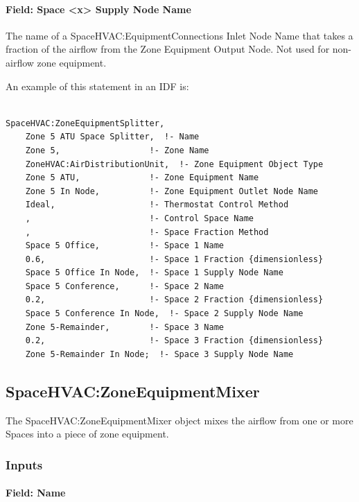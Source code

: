 \paragraph{Field: Space \textless{}x\textgreater{} Supply Node Name}\label{field-seqsplitter-space-supply-node-name}

The name of a SpaceHVAC:EquipmentConnections Inlet Node Name that takes a fraction of the airflow from the Zone Equipment Output Node.
Not used for non-airflow zone equipment.

An example of this statement in an IDF is:

\begin{lstlisting}

SpaceHVAC:ZoneEquipmentSplitter,
    Zone 5 ATU Space Splitter,  !- Name
    Zone 5,                  !- Zone Name
    ZoneHVAC:AirDistributionUnit,  !- Zone Equipment Object Type
    Zone 5 ATU,              !- Zone Equipment Name
    Zone 5 In Node,          !- Zone Equipment Outlet Node Name
    Ideal,                   !- Thermostat Control Method
    ,                        !- Control Space Name
    ,                        !- Space Fraction Method
    Space 5 Office,          !- Space 1 Name
    0.6,                     !- Space 1 Fraction {dimensionless}
    Space 5 Office In Node,  !- Space 1 Supply Node Name
    Space 5 Conference,      !- Space 2 Name
    0.2,                     !- Space 2 Fraction {dimensionless}
    Space 5 Conference In Node,  !- Space 2 Supply Node Name
    Zone 5-Remainder,        !- Space 3 Name
    0.2,                     !- Space 3 Fraction {dimensionless}
    Zone 5-Remainder In Node;  !- Space 3 Supply Node Name
\end{lstlisting}

\subsection{SpaceHVAC:ZoneEquipmentMixer}\label{spacehvaczoneequipmentmixer}

The SpaceHVAC:ZoneEquipmentMixer object mixes the airflow from one or more Spaces into a piece of zone equipment.

\subsubsection{Inputs}\label{inputs-1-052-seqmixer}

\paragraph{Field: Name}\label{field-seqmixer-name-015}

